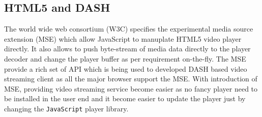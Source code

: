 \subsection{HTML5 and DASH}
The world wide web consortium (W3C) specifies the experimental media source extension (MSE) which allow JavaScript to manuplate HTML5 video player directly. It also allows to push byte-stream of media data directly to the player decoder and change the player buffer as per requirement on-the-fly. The MSE provide a rich set of API which is being used to developed DASH based video streaming client as all the major browser support the MSE. With introduction of MSE, providing video streaming service become easier as no fancy player need to be installed in the user end and it become easier to update the player just by changing the {\tt JavaScript} player library.